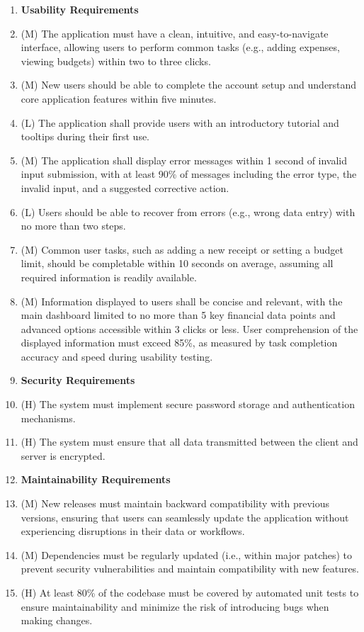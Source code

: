 \documentclass[12pt]{article}
\begin{document}
\begin{enumerate}[label=NFR\arabic*]
  \item[]\textbf{Usability Requirements}
  \item (M) The application must have a clean, intuitive, and easy-to-navigate
  interface, allowing users to perform common tasks (e.g., adding expenses,
  viewing budgets) within two to three clicks.
  \item (M) New users should be able to complete the account setup and understand
  core application features within five minutes.
  \item (L) The application shall provide users with an introductory tutorial and
  tooltips during their first use.
  \item (M) The application shall display error messages within 1 second of invalid 
  input submission, with at least 90\% of messages including the error type, the invalid 
  input, and a suggested corrective action.
  \item (L) Users should be able to recover from errors (e.g., wrong data entry)
  with no more than two steps.
  \item (M) Common user tasks, such as adding a new receipt or setting a budget
  limit, should be completable within 10 seconds on average, assuming all
  required information is readily available.
  \item (M) Information displayed to users shall be concise and relevant, with 
  the main dashboard limited to no more than 5 key financial data points and advanced 
  options accessible within 3 clicks or less. User comprehension of the displayed 
  information must exceed 85\%, as measured by task completion accuracy and speed 
  during usability testing.

  \item[] \textbf{Security Requirements}
  \item (H) The system must implement secure password storage and authentication
  mechanisms.
  \item (H) The system must ensure that all data transmitted between the client and
  server is encrypted.
  

  \item[] \textbf{Maintainability Requirements}
  \item (M) New releases must maintain backward compatibility with previous
  versions, ensuring that users can seamlessly update the application without
  experiencing disruptions in their data or workflows.
  \item (M) Dependencies must be regularly updated (i.e., within major patches)
  to prevent security vulnerabilities and maintain compatibility with new
  features.
  \item (H) At least 80\% of the codebase must be covered by automated unit
  tests to ensure maintainability and minimize the risk of introducing bugs when
  making
  changes.


\end{enumerate}
\end{document}
